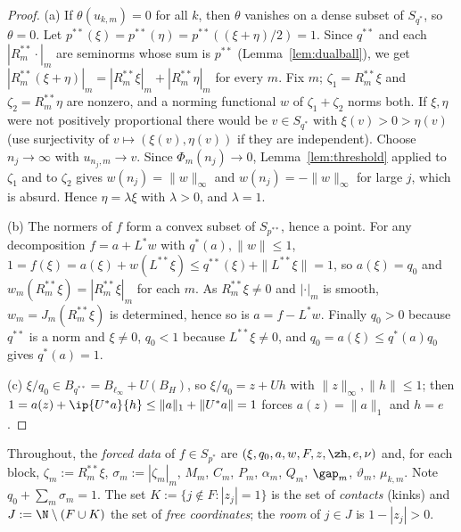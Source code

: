 \begin{proof}
(a) If $\theta(u_{k,m})=0$ for all $k$, then $\theta$ vanishes on a dense
subset of $S_{q^*}$, so $\theta=0$.  Let
$p^{**}(\xi)=p^{**}(\eta)=p^{**}((\xi+\eta)/2)=1$.  Since $q^{**}$ and each
$|R_m^{**}\cdot|_m$ are seminorms whose sum is $p^{**}$
(Lemma~\ref{lem:dualball}), we get
$|R_m^{**}(\xi+\eta)|_m=|R_m^{**}\xi|_m+|R_m^{**}\eta|_m$ for every $m$.
Fix $m$; $\zeta_1=R_m^{**}\xi$ and $\zeta_2=R_m^{**}\eta$ are nonzero, and a
norming functional $w$ of $\zeta_1+\zeta_2$ norms both.  If $\xi,\eta$ were
not positively proportional there would be $v\in S_{q^*}$ with
$\xi(v)>0>\eta(v)$ (use surjectivity of $v\mapsto(\xi(v),\eta(v))$ if they
are independent).  Choose $n_j\to\infty$ with $u_{n_j,m}\to v$.  Since
$\Phi_m(n_j)\to0$, Lemma~\ref{lem:threshold} applied to $\zeta_1$ and to
$\zeta_2$ gives $w(n_j)=\|w\|_\infty$ and $w(n_j)=-\|w\|_\infty$ for large
$j$, which is absurd.  Hence $\eta=\lambda\xi$ with $\lambda>0$, and
$\lambda=1$.

(b) The normers of $f$ form a convex subset of $S_{p^{**}}$, hence a point.
For any decomposition $f=a+L^*w$ with $q^*(a),\|w\|\le1$,
$1=f(\xi)=a(\xi)+w(L^{**}\xi)\le q^{**}(\xi)+\|L^{**}\xi\|=1$, so
$a(\xi)=q_0$ and $w_m(R_m^{**}\xi)=|R_m^{**}\xi|_m$ for each $m$.  As
$R_m^{**}\xi\ne0$ and $|\cdot|_m$ is smooth, $w_m=J_m(R_m^{**}\xi)$ is
determined, hence so is $a=f-L^*w$.  Finally $q_0>0$ because $q^{**}$ is a norm and
$\xi\ne0$, $q_0<1$ because $L^{**}\xi\ne0$, and
$q_0=a(\xi)\le q^*(a)q_0$ gives $q^*(a)=1$.

(c) $\xi/q_0\in B_{q^{**}}=B_{\ell_\infty}+U(B_H)$, so $\xi/q_0=z+Uh$ with
$\|z\|_\infty,\|h\|\le1$; then $1=a(z)+\ip{U^*a}{h}\le\|a\|_1+\|U^*a\|=1$
forces $a(z)=\|a\|_1$ and $h=e$.
\end{proof}

Throughout, the \emph{forced data} of $f\in S_{p^*}$ are
$(\xi,q_0,a,w,F,z,\zh,e,\nu)$ and, for each block,
$\zeta_m:=R_m^{**}\xi$, $\sigma_m:=|\zeta_m|_m$, $M_m$, $C_m$, $P_m$,
$\alpha_m$, $Q_m$, $\gap_m$, $\vartheta_m$, $\mu_{k,m}$.  Note
$q_0+\sum_m\sigma_m=1$.  The set $K:=\{j\notin F:|z_j|=1\}$ is the set of
\emph{contacts} (kinks) and $J:=\N\setminus(F\cup K)$ the set of
\emph{free coordinates}; the \emph{room} of $j\in J$ is $1-|z_j|>0$.

